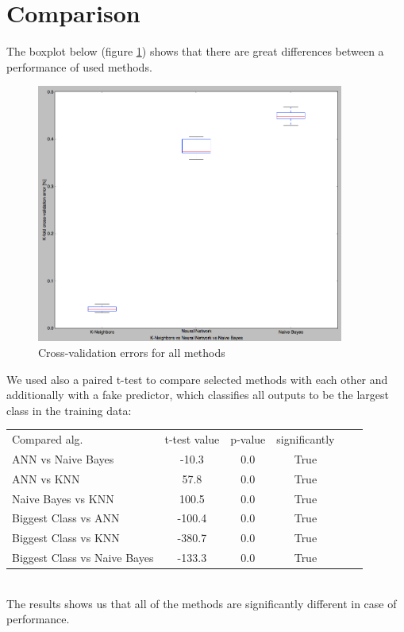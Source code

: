 \section{Comparison}
The boxplot below (figure \ref{fig:cross_errors}) shows that there are great differences between a performance of used methods. 
\begin{figure}[!tbh]
	\centering
	\includegraphics[width=0.9\textwidth]{figures/cross_errors}
	\caption{Cross-validation errors for all methods}
	\label{fig:cross_errors}
\end{figure}
We used also a paired t-test to compare selected methods with each other and additionally with a fake predictor, which 
classifies all outputs to be the largest class in the training data: \\
\begin{tabular}{l*{4}{c}r}
Compared alg. & t-test value & p-value & significantly \\
ANN vs Naive Bayes & -10.3 & 0.0 & True \\
ANN vs KNN & 57.8 & 0.0 & True \\
Naive Bayes vs KNN & 100.5 & 0.0 & True \\
Biggest Class vs ANN & -100.4 & 0.0 & True \\
Biggest Class vs KNN & -380.7 & 0.0 & True \\
Biggest Class vs Naive Bayes & -133.3 & 0.0 & True \\
\end{tabular} \\
The results shows us that all of the methods are significantly different in case of performance.

